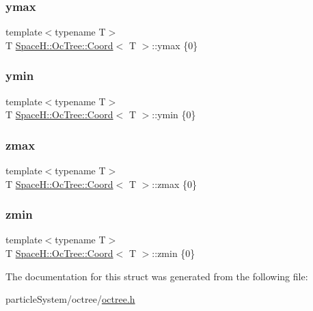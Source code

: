 \subsubsection{\texorpdfstring{ymax}{ymax}}
{\footnotesize\ttfamily template$<$typename T$>$ \\
T \mbox{\hyperlink{struct_space_h_1_1_oc_tree_1_1_coord}{Space\+H\+::\+Oc\+Tree\+::\+Coord}}$<$ T $>$\+::ymax \{0\}}

\mbox{\label{struct_space_h_1_1_oc_tree_1_1_coord_a094b49bff80734585def902f87973f15}} 
\subsubsection{\texorpdfstring{ymin}{ymin}}
{\footnotesize\ttfamily template$<$typename T$>$ \\
T \mbox{\hyperlink{struct_space_h_1_1_oc_tree_1_1_coord}{Space\+H\+::\+Oc\+Tree\+::\+Coord}}$<$ T $>$\+::ymin \{0\}}

\mbox{\label{struct_space_h_1_1_oc_tree_1_1_coord_aeb57e74e4175c2973f3bc5cc0b0cb120}} 
\subsubsection{\texorpdfstring{zmax}{zmax}}
{\footnotesize\ttfamily template$<$typename T$>$ \\
T \mbox{\hyperlink{struct_space_h_1_1_oc_tree_1_1_coord}{Space\+H\+::\+Oc\+Tree\+::\+Coord}}$<$ T $>$\+::zmax \{0\}}

\mbox{\label{struct_space_h_1_1_oc_tree_1_1_coord_a62fc99017cd4495c3e93f779002870e9}} 
\subsubsection{\texorpdfstring{zmin}{zmin}}
{\footnotesize\ttfamily template$<$typename T$>$ \\
T \mbox{\hyperlink{struct_space_h_1_1_oc_tree_1_1_coord}{Space\+H\+::\+Oc\+Tree\+::\+Coord}}$<$ T $>$\+::zmin \{0\}}



The documentation for this struct was generated from the following file\+:\begin{DoxyCompactItemize}
\item 
particle\+System/octree/\mbox{\hyperlink{octree_8h}{octree.\+h}}\end{DoxyCompactItemize}
